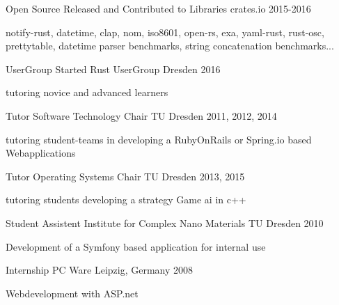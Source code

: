 \begin{cventries}

  \cventry
    {Open Source}
    {Released and Contributed to Libraries}
    {crates.io}
    {2015-2016}
    {
      \begin{cvitems}
      \item[] {notify-rust, datetime, clap, nom, iso8601, open-rs, exa, yaml-rust, rust-osc, prettytable, datetime parser benchmarks, string concatenation benchmarks...}
      \end{cvitems}
    }

  \cventry
    {UserGroup}
    {Started Rust UserGroup}
    {Dresden}
    {2016}
    {
      \begin{cvitems}
      \item[] {tutoring novice and advanced learners}
      \end{cvitems}
    }

  \cventry
    {Tutor}
    {Software Technology Chair}
    {TU Dresden}
    {2011, 2012, 2014}
    {
      \begin{cvitems}
      \item[] {tutoring student-teams in developing a RubyOnRails or Spring.io based Webapplications}
      \end{cvitems}
    }

  \cventry
    {Tutor}
    {Operating Systems Chair}
    {TU Dresden}
    {2013, 2015}
    {
      \begin{cvitems}
      \item[] {tutoring students developing a strategy Game ai in c++}
      \end{cvitems}
    }

  \cventry
    {Student Assistent}
    {Institute for Complex Nano Materials}
    {TU Dresden}
    {2010}
    {
      \begin{cvitems}
      \item[] {Development of a Symfony based application for internal use}
      \end{cvitems}
    }

  \cventry
    {Internship}
    {PC Ware}
    {Leipzig, Germany}
    {2008}
    {
      \begin{cvitems}
      \item {Webdevelopment with ASP.net}
      \end{cvitems}
    }

\end{cventries}
